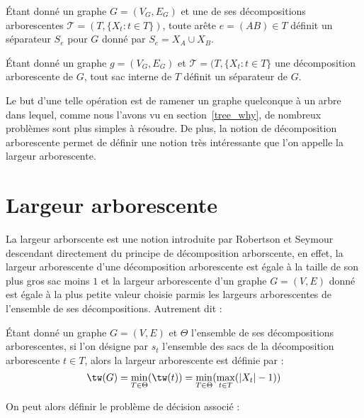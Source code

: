 \begin{nprop}
    \label{esep}
    Étant donné un graphe $G=(V_G,E_G)$ et une de ses décompositions arborescentes $\mathcal{T} =(T, \{X_t
    : t \in T\})$, toute arête $e=(AB) \in T$ définit un séparateur $S_e$ pour $G$ donné par $S_e =
    X_A \cup X_B$.
\end{nprop}

\begin{nprop}
    \label{nsep}
    Étant donné un graphe $g=(V_G, E_G)$ et $\mathcal{T} = (T, \{X_t : t \in T\}$ une décomposition
    arborescente de $G$, tout sac interne de $T$ définit un séparateur de $G$.
\end{nprop}

Le but d'une telle opération est de ramener un graphe quelconque à un arbre dans lequel, comme nous
l'avons vu en section~\ref{tree_why}, de nombreux problèmes sont plus simples à résoudre. De plus,
la notion de décomposition arborescente permet de définir une notion très intéressante que l'on
appelle la largeur arborescente.
\section{Largeur arborescente}

La largeur arborscente est une notion introduite par Robertson et Seymour~\cite{robalgorithmic}
descendant directement du principe de décomposition arborscente, en effet, la largeur arborescente
d'une décomposition arborescente est égale à la taille de son plus gros sac moins $1$ et la largeur
arborescente d'un graphe $G=(V,E)$ donné est égale à la plus petite valeur choisie parmis les
largeurs arborescentes de l'ensemble de ses décompositions. Autrement dit :

\begin{ndf}
    Étant donné un graphe $G=(V,E)$ et $\Theta$ l'ensemble de ses décompositions arborescentes, si l'on
    désigne par $s_t$ l'ensemble des sacs de la décomposition arborescente $t \in T$, alors la
    largeur arborescente est définie par : \[
        \tw(G) = \min_{T\in \Theta}(\tw(t)) = \min_{T\in \Theta}(\max_{t \in T}(|X_t| - 1))
    \]
\end{ndf}

On peut alors définir le problème de décision associé :


